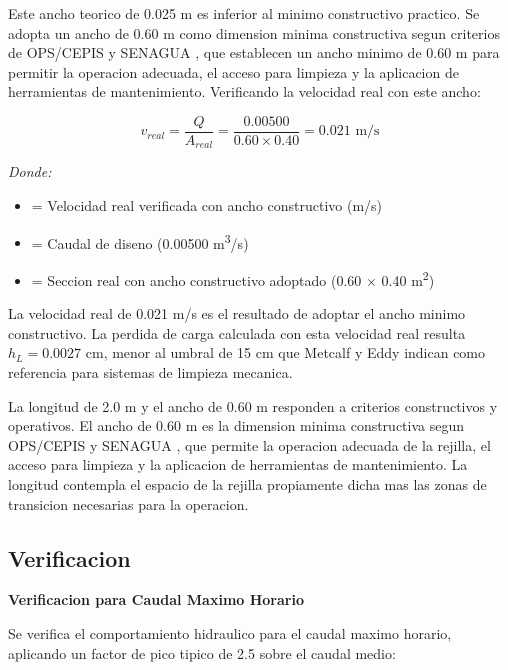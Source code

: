 \documentclass[12pt,a4paper]{article}
\begin{document}
Este ancho teorico de 0.025 m es inferior al minimo constructivo practico. Se adopta un ancho de 0.60 m como dimension minima constructiva segun criterios de OPS/CEPIS \cite{ops2005} y SENAGUA \cite{senagua2012}, que establecen un ancho minimo de 0.60 m para permitir la operacion adecuada, el acceso para limpieza y la aplicacion de herramientas de mantenimiento. Verificando la velocidad real con este ancho:

\begin{equation}
v_{{real}} = \frac{Q}{A_{{real}}} = \frac{0.00500}{0.60 \times 0.40} = 0.021 \text{ m/s}
\end{equation}

\textit{Donde:}
\begin{itemize}[noitemsep,leftmargin=2em]
    \item[$v_{{real}}$] = Velocidad real verificada con ancho constructivo (m/s)
    \item[$Q$] = Caudal de diseno (0.00500 m\textsuperscript{3}/s)
    \item[$A_{{real}}$] = Seccion real con ancho constructivo adoptado (0.60 $\times$ 0.40 m\textsuperscript{2})
\end{itemize}

La velocidad real de 0.021 m/s es el resultado de adoptar el ancho minimo constructivo. La perdida de carga calculada con esta velocidad real resulta $h_L = 0.0027$ cm, menor al umbral de 15 cm que Metcalf y Eddy \cite{metcalf2014} indican como referencia para sistemas de limpieza mecanica.

La longitud de 2.0 m y el ancho de 0.60 m responden a criterios constructivos y operativos. El ancho de 0.60 m es la dimension minima constructiva segun OPS/CEPIS \cite{ops2005} y SENAGUA \cite{senagua2012}, que permite la operacion adecuada de la rejilla, el acceso para limpieza y la aplicacion de herramientas de mantenimiento. La longitud contempla el espacio de la rejilla propiamente dicha mas las zonas de transicion necesarias para la operacion.





\subsection{Verificacion}

\textbf{Verificacion para Caudal Maximo Horario}

Se verifica el comportamiento hidraulico para el caudal maximo horario, aplicando un factor de pico tipico de 2.5 sobre el caudal medio:
\end{document}
